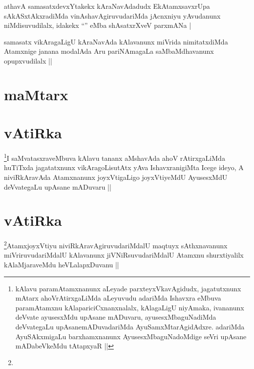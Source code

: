 

\begin{artha}
athavA samasatxdevxYtakekx kAraNavAdadudx EkAtamxsavxrUpa
sAkASxtAkxradiMda vinAshavAgiruvudariMda jAcnxniyu yAvudanunx
niMdisuvudilalx, idakekx ``\stext'' eMba shAsatxrXveV parxmANa |
\end{artha}


\begin{artha}
samasatx vikAragaLigU kAraNavAda kAlavanunx miVrida nimitatxdiMda
Atamxnige janana modalAda Aru pariNAmagaLa saMbaMdhavanunx
opupxvudilalx ||
\end{artha}


\section*{maMtarx}

\section*{vAtiRka}

\begin{artha}
\footnote{kAlavu paramAtamxnanunx aLeyade parxteyxVkavAgidudx,
  jagatutxnunx mAtarx ahoVrAtirxgaLiMda aLeyuvudu adariMda Ishavxra
  eMbuva paramAtamxnu kAlapariciCxnanxnalalx, kAlagaLigU niyAmaka,
  ivananunx deVvate ayusesxMdu upAsane mADuvaru, ayusesxMbaguNadiMda
  deVvategaLu upAsanemADuvadariMda AyuSamxMtarAgidAdxre. adariMda
  AyuSAkxmigaLu barxhamxnanunx AyusesxMbaguNadoMdige seVri upAsane
  mADabeVkeMdu tAtapxyaR  ||}I saMvatasxraveMbuva kAlavu tananx aMshavAda ahoV
rAtirxgaLiMda huTiTxda jagatatxnunx vikAragoLisutAtx yAva
IshavxranigiMta Icege ideyo, A niviRkAravAda Atamxnanunx joyxVtigaLigo
joyxVtiyeMdU AyusesxMdU deVvategaLu upAsane mADuvaru ||
\end{artha}

\section*{vAtiRka}


\begin{artha}
\footnote{\stext}AtamxjoyxVtiyu niviRkAravAgiruvudariMdalU maqtuyx
sAthxnavanunx miVriruvudariMdalU kAlavanunx jiVNiRsuvudariMdalU
Atamxnu shurxtiyalilx kAlaMjaraveMdu heVLalapxDuvanu ||
\end{artha}

